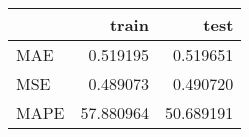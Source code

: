 \begin{tabular}{lrr}
\toprule
{} &      train &       test \\
\midrule
MAE  &   0.519195 &   0.519651 \\
MSE  &   0.489073 &   0.490720 \\
MAPE &  57.880964 &  50.689191 \\
\bottomrule
\end{tabular}
